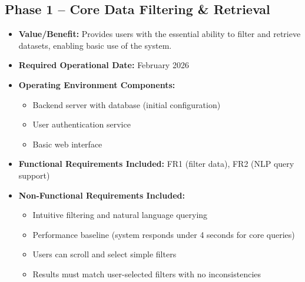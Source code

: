\documentclass[12pt]{article}
\begin{document}
\subsection*{Phase 1 -- Core Data Filtering \& Retrieval}
\begin{itemize}
    \item \textbf{Value/Benefit:} Provides users with the essential ability to filter and retrieve datasets, enabling basic use of the system.
    \item \textbf{Required Operational Date:} February 2026
    \item \textbf{Operating Environment Components:}
    \begin{itemize}
        \item Backend server with database (initial configuration)
        \item User authentication service
        \item Basic web interface
    \end{itemize}
    \item \textbf{Functional Requirements Included:} FR1 (filter data), FR2 (NLP query support)
    \item \textbf{Non-Functional Requirements Included:} 
    \begin{itemize}
        \item Intuitive filtering and natural language querying
        \item Performance baseline (system responds under 4 seconds for core queries)
        \item Users can scroll and select simple filters
        \item Results must match user-selected filters with no inconsistencies
    \end{itemize}
\end{itemize}
\end{document}
